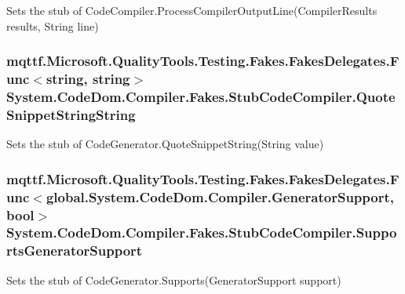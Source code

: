Sets the stub of Code\-Compiler.\-Process\-Compiler\-Output\-Line(\-Compiler\-Results results, String line)

\hypertarget{class_system_1_1_code_dom_1_1_compiler_1_1_fakes_1_1_stub_code_compiler_ae0388b8dc443b884f7ab55e73296d8c8}{
\subsubsection[{Quote\-Snippet\-String\-String}]{\setlength{\rightskip}{0pt plus 5cm}mqttf.\-Microsoft.\-Quality\-Tools.\-Testing.\-Fakes.\-Fakes\-Delegates.\-Func$<$string, string$>$ System.\-Code\-Dom.\-Compiler.\-Fakes.\-Stub\-Code\-Compiler.\-Quote\-Snippet\-String\-String}}\label{class_system_1_1_code_dom_1_1_compiler_1_1_fakes_1_1_stub_code_compiler_ae0388b8dc443b884f7ab55e73296d8c8}


Sets the stub of Code\-Generator.\-Quote\-Snippet\-String(\-String value)

\hypertarget{class_system_1_1_code_dom_1_1_compiler_1_1_fakes_1_1_stub_code_compiler_ac4f66bc0cfb28b3da599e124e0e2b132}{
\subsubsection[{Supports\-Generator\-Support}]{\setlength{\rightskip}{0pt plus 5cm}mqttf.\-Microsoft.\-Quality\-Tools.\-Testing.\-Fakes.\-Fakes\-Delegates.\-Func$<$global.\-System.\-Code\-Dom.\-Compiler.\-Generator\-Support, bool$>$ System.\-Code\-Dom.\-Compiler.\-Fakes.\-Stub\-Code\-Compiler.\-Supports\-Generator\-Support}}\label{class_system_1_1_code_dom_1_1_compiler_1_1_fakes_1_1_stub_code_compiler_ac4f66bc0cfb28b3da599e124e0e2b132}


Sets the stub of Code\-Generator.\-Supports(\-Generator\-Support support)

